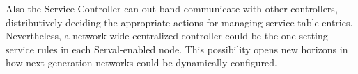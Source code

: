 Also the Service Controller can out-band communicate with other controllers, distributively deciding the appropriate actions for managing service table entries.
Nevertheless, a network-wide centralized controller could be the one setting service rules in each Serval-enabled node.
This possibility opens new horizons in how next-generation networks could be dynamically configured. 





